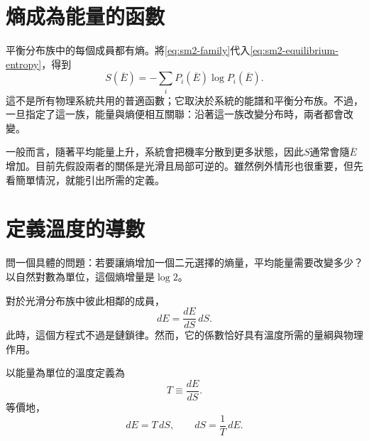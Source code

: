 \begin{classroomqa}
\end{classroomqa}

\begin{classroomqa}
\end{classroomqa}

\section{熵成為能量的函數}

平衡分布族中的每個成員都有熵。將\eqref{eq:sm2-family}代入\eqref{eq:sm2-equilibrium-entropy}，得到
\begin{equation}
 S(\overline E)
 =-\sum_iP_i(\overline E)\log P_i(\overline E).
 \label{eq:sm2-entropy-energy}
\end{equation}
這不是所有物理系統共用的普適函數；它取決於系統的能譜和平衡分布族。不過，一旦指定了這一族，能量與熵便相互關聯：沿著這一族改變分布時，兩者都會改變。

一般而言，隨著平均能量上升，系統會把機率分散到更多狀態，因此\(S\)通常會隨\(\overline E\)增加。目前先假設兩者的關係是光滑且局部可逆的。雖然例外情形也很重要，但先看簡單情況，就能引出所需的定義。

\section{定義溫度的導數}

問一個具體的問題：若要讓熵增加一個二元選擇的熵量，平均能量需要改變多少？以自然對數為單位，這個熵增量是\(\log2\)。

對於光滑分布族中彼此相鄰的成員，
\begin{equation}
 dE=\frac{dE}{dS}\,dS.
 \label{eq:sm2-differential-identity}
\end{equation}
此時，這個方程式不過是鏈鎖律。然而，它的係數恰好具有溫度所需的量綱與物理作用。

\begin{definition}
以能量為單位的溫度定義為
\begin{equation}
 T\equiv\frac{dE}{dS}.
 \label{eq:sm2-temperature-definition}
\end{equation}
等價地，
\begin{equation}
 dE=T\,dS,
 \qquad
 dS=\frac{1}{T}\,dE.
 \label{eq:sm2-fundamental-differentials}
\end{equation}
\end{definition}

